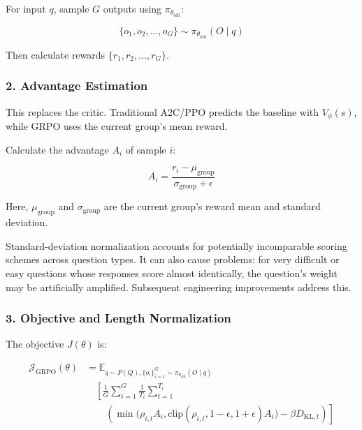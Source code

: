 For input \(q\), sample \(G\) outputs using \(\pi_{\theta_{\mathrm{old}}}\):

\[
\{o_1,o_2,\ldots,o_G\}\sim \pi_{\theta_{\mathrm{old}}}(O\mid q)
\]

Then calculate rewards \(\{r_1,r_2,\ldots,r_G\}\).

\hypertarget{advantage-estimation}{%
\subsubsection{2. Advantage Estimation}\label{advantage-estimation}}

This replaces the critic. Traditional A2C/PPO predicts the baseline with \(V_{\phi}(s)\), while GRPO uses the current group's mean reward.

Calculate the advantage \(A_i\) of sample \(i\):

\[
A_i=\frac{r_i-\mu_{\mathrm{group}}}{\sigma_{\mathrm{group}}+\epsilon}
\]

Here, \(\mu_{\mathrm{group}}\) and \(\sigma_{\mathrm{group}}\) are the current group's reward mean and standard deviation.

Standard-deviation normalization accounts for potentially incomparable scoring schemes across question types. It can also cause problems: for very difficult or easy questions whose responses score almost identically, the question's weight may be artificially amplified. Subsequent engineering improvements address this.

\hypertarget{objective-and-length-normalization}{%
\subsubsection{3. Objective and Length Normalization}\label{objective-and-length-normalization}}

The objective \(J(\theta)\) is:

\[
\begin{aligned}
\mathcal{J}_{\mathrm{GRPO}}(\theta)
&=\mathbb{E}_{q\sim P(Q),\{o_i\}_{i=1}^{G}\sim\pi_{\theta_{\mathrm{old}}}(O\mid q)} \\
&\quad \left[
\frac{1}{G}\sum_{i=1}^{G}\frac{1}{T_i}\sum_{t=1}^{T_i}
\right. \\
&\qquad \left.
\left(
\min\!\bigl(\rho_{i,t}A_i,\mathrm{clip}(\rho_{i,t},1-\epsilon,1+\epsilon)A_i\bigr)
-\beta D_{\mathrm{KL},t}
\right)
\right]
\end{aligned}
\]

